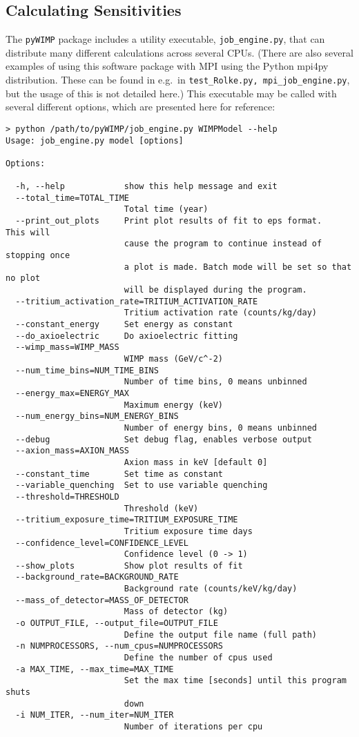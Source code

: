 		\subsection{Calculating Sensitivities}
The \lstinline!pyWIMP! package includes a utility executable, \lstinline!job_engine.py!, that can distribute
many different calculations across several CPUs.  (There are also several examples of using this software package
with MPI using the Python mpi4py distribution.  These can be found in e.g.~in \lstinline!test_Rolke.py, mpi_job_engine.py!, 
but the usage of this is not detailed here.)  This executable may be called with several different options, which are presented
here for reference:

				\lstset{language=csh, tabsize=4}
				\begin{lstlisting}	
> python /path/to/pyWIMP/job_engine.py WIMPModel --help
Usage: job_engine.py model [options]

Options:

  -h, --help            show this help message and exit
  --total_time=TOTAL_TIME
                        Total time (year)
  --print_out_plots     Print plot results of fit to eps format.   This will
                        cause the program to continue instead of stopping once
                        a plot is made. Batch mode will be set so that no plot
                        will be displayed during the program.
  --tritium_activation_rate=TRITIUM_ACTIVATION_RATE
                        Tritium activation rate (counts/kg/day)
  --constant_energy     Set energy as constant
  --do_axioelectric     Do axioelectric fitting
  --wimp_mass=WIMP_MASS
                        WIMP mass (GeV/c^-2)
  --num_time_bins=NUM_TIME_BINS
                        Number of time bins, 0 means unbinned
  --energy_max=ENERGY_MAX
                        Maximum energy (keV)
  --num_energy_bins=NUM_ENERGY_BINS
                        Number of energy bins, 0 means unbinned
  --debug               Set debug flag, enables verbose output
  --axion_mass=AXION_MASS
                        Axion mass in keV [default 0]
  --constant_time       Set time as constant
  --variable_quenching  Set to use variable quenching
  --threshold=THRESHOLD
                        Threshold (keV)
  --tritium_exposure_time=TRITIUM_EXPOSURE_TIME
                        Tritium exposure time days
  --confidence_level=CONFIDENCE_LEVEL
                        Confidence level (0 -> 1)
  --show_plots          Show plot results of fit
  --background_rate=BACKGROUND_RATE
                        Background rate (counts/keV/kg/day)
  --mass_of_detector=MASS_OF_DETECTOR
                        Mass of detector (kg)
  -o OUTPUT_FILE, --output_file=OUTPUT_FILE
                        Define the output file name (full path)
  -n NUMPROCESSORS, --num_cpus=NUMPROCESSORS
                        Define the number of cpus used
  -a MAX_TIME, --max_time=MAX_TIME
                        Set the max time [seconds] until this program shuts
                        down
  -i NUM_ITER, --num_iter=NUM_ITER
                        Number of iterations per cpu
				\end{lstlisting}	

